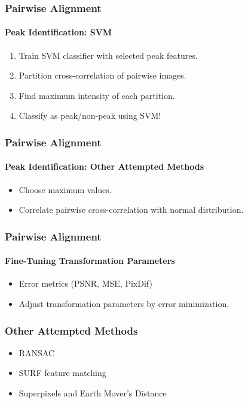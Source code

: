 \documentclass{beamer}
\begin{document}
\begin{frame}
\frametitle{Pairwise Alignment}
\framesubtitle{Peak Identification: SVM} 
\begin{enumerate}
\item Train SVM classifier with selected peak features. 
\item Partition cross-correlation of pairwise images. 
\item Find maximum intensity of each partition. 
\item Classify as peak/non-peak using SVM! 
\end{enumerate}
\end{frame}

\begin{frame}
\frametitle{Pairwise Alignment}
\framesubtitle{Peak Identification: Other Attempted Methods} 
\begin{itemize}
\item Choose maximum values.
\item Correlate pairwise cross-correlation with normal distribution. 
\end{itemize}
\end{frame}

\begin{frame}
\frametitle{Pairwise Alignment}
\framesubtitle{Fine-Tuning Transformation Parameters} 
\begin{itemize}
\item Error metrics (PSNR, MSE, PixDif)
\item Adjust transformation parameters by error minimization.
\end{itemize}
\end{frame}

\begin{frame}
\frametitle{Other Attempted Methods}
\begin{itemize}
\item RANSAC
\item SURF feature matching
\item Superpixels and Earth Mover's Distance 
\end{itemize}
\end{frame}
\end{document}
